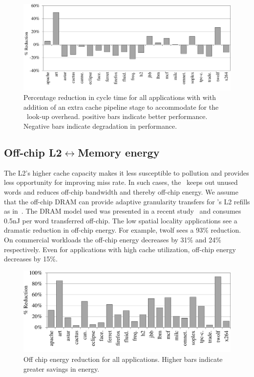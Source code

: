 {{\begin{figure}[h]
  \centering
  \vspace{10pt}
  \includegraphics[width=\textwidth]{files/Plots/08-ExtraStage.pdf}
  \caption[Extra Cache Pipeline Stage Performance]{Percentage reduction in cycle time for all applications with with addition of an extra cache pipeline stage to accommodate for the \AC\ look-up overhead. positive bars indicate better performance. Negative bars indicate degradation in performance.}
  \label{fig:extra_cache_pipeline_stage}
\end{figure}

\subsection{Off-chip L2$\leftrightarrow$Memory energy}
The L2's higher cache capacity makes it less susceptible to pollution and provides less opportunity for improving miss rate. In such cases, the \AC\ keeps out unused words and reduces off-chip bandwidth and thereby off-chip energy. We assume that the off-chip DRAM can provide adaptive granularity transfers for \AC{}'s L2 refills as in~\cite{Yoon_Jeong_Erez_2011}. The DRAM model used was presented in a recent study~\cite{exascale} and consumes 0.5nJ per word transferred off-chip. The low spatial locality applications see a dramatic reduction in off-chip energy. For example, twolf sees a 93\% reduction. On commercial workloads the off-chip energy decreases by 31\% and 24\% respectively. Even for applications with high cache utilization, off-chip energy decreases by 15\%.

\begin{figure}[h]
  \centering
  \includegraphics[width=\textwidth]{files/Plots/08-Oracle-OffChip-Energy.pdf}
  \caption[Off-Chip Energy Reduction]{Off chip energy reduction for all applications. Higher bars indicate greater savings in energy.}
  \label{fig:offchip_energy}
\end{figure}


}}
